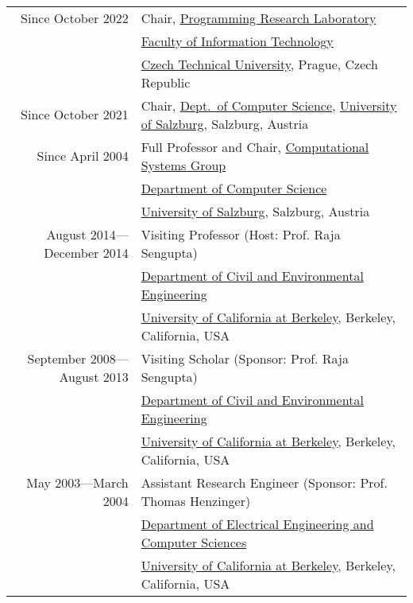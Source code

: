  \\
\begin{tabular}{rl}
Since October 2022 & Chair, \href{https://prl-prg.github.io}{Programming Research Laboratory} \\
                 & \href{https://fit.cvut.cz}{Faculty of Information Technology} \\
                 & \href{https://cvut.cz}{Czech Technical University}, Prague, Czech Republic \\
\noalign{\smallskip}
Since October 2021 & Chair, \href{https://informatik.uni-salzburg.at}{Dept.~of Computer Science}, \href{https://plus.ac.at}{University of Salzburg}, Salzburg, Austria \\
\noalign{\smallskip}
Since April 2004 & Full Professor and Chair, \href{http://www.cs.uni-salzburg.at/~ck}{Computational Systems Group} \\
                 & \href{https://informatik.uni-salzburg.at}{Department of Computer Science} \\
                 & \href{https://plus.ac.at}{University of Salzburg}, Salzburg, Austria \\
\noalign{\smallskip}
August 2014---December 2014 & Visiting Professor (Host: Prof. Raja Sengupta)\\
                            & \href{http://www.ce.berkeley.edu}{Department of Civil and Environmental Engineering} \\
                            & \href{http://www.berkeley.edu}{University of California at Berkeley}, Berkeley, California, USA \\
\noalign{\smallskip}
September 2008---August 2013 & Visiting Scholar (Sponsor: Prof. Raja Sengupta)\\
                             & \href{http://www.ce.berkeley.edu}{Department of Civil and Environmental Engineering} \\
                             & \href{http://www.berkeley.edu}{University of California at Berkeley}, Berkeley, California, USA \\
\noalign{\smallskip}
May 2003---March 2004 & Assistant Research Engineer (Sponsor: Prof. Thomas Henzinger)\\
                      & \href{http://www.eecs.berkeley.edu}{Department of Electrical Engineering and Computer Sciences} \\
                      & \href{http://www.berkeley.edu}{University of California at Berkeley}, Berkeley, California, USA \\

\end{tabular}

